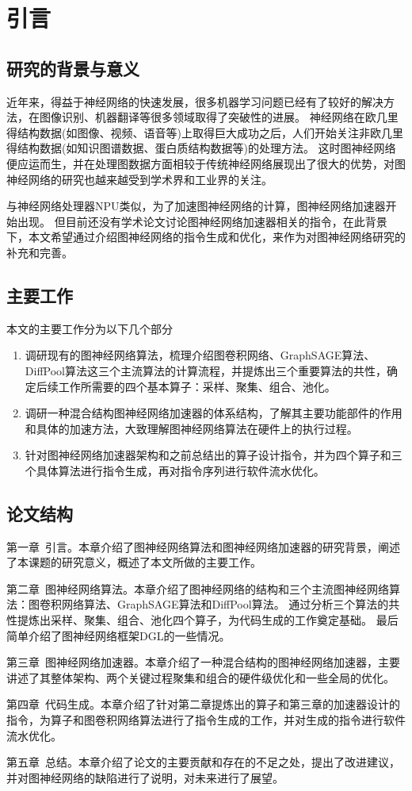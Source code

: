 
\chapter{引言}

\section{研究的背景与意义}

近年来，得益于神经网络的快速发展，很多机器学习问题已经有了较好的解决方法，在图像识别、机器翻译等很多领域取得了突破性的进展。
神经网络在欧几里得结构数据(如图像、视频、语音等)上取得巨大成功之后，人们开始关注非欧几里得结构数据(如知识图谱数据、蛋白质结构数据等)的处理方法。
这时图神经网络便应运而生，并在处理图数据方面相较于传统神经网络展现出了很大的优势，对图神经网络的研究也越来越受到学术界和工业界的关注。

与神经网络处理器NPU类似，为了加速图神经网络的计算，图神经网络加速器开始出现。
但目前还没有学术论文讨论图神经网络加速器相关的指令，在此背景下，本文希望通过介绍图神经网络的指令生成和优化，来作为对图神经网络研究的补充和完善。

\section{主要工作}

本文的主要工作分为以下几个部分
\begin{enumerate}
    \item 调研现有的图神经网络算法，梳理介绍图卷积网络、GraphSAGE算法、DiffPool算法这三个主流算法的计算流程，并提炼出三个重要算法的共性，确定后续工作所需要的四个基本算子：采样、聚集、组合、池化。
    \item 调研一种混合结构图神经网络加速器的体系结构，了解其主要功能部件的作用和具体的加速方法，大致理解图神经网络算法在硬件上的执行过程。
    \item 针对图神经网络加速器架构和之前总结出的算子设计指令，并为四个算子和三个具体算法进行指令生成，再对指令序列进行软件流水优化。
\end{enumerate}

\section{论文结构}

第一章\ 引言。本章介绍了图神经网络算法和图神经网络加速器的研究背景，阐述了本课题的研究意义，概述了本文所做的主要工作。

第二章\ 图神经网络算法。本章介绍了图神经网络的结构和三个主流图神经网络算法：图卷积网络算法、GraphSAGE算法和DiffPool算法。
通过分析三个算法的共性提炼出采样、聚集、组合、池化四个算子，为代码生成的工作奠定基础。
最后简单介绍了图神经网络框架DGL的一些情况。

第三章\ 图神经网络加速器。本章介绍了一种混合结构的图神经网络加速器，主要讲述了其整体架构、两个关键过程聚集和组合的硬件级优化和一些全局的优化。

第四章\ 代码生成。本章介绍了针对第二章提炼出的算子和第三章的加速器设计的指令，为算子和图卷积网络算法进行了指令生成的工作，并对生成的指令进行软件流水优化。

第五章\ 总结。本章介绍了论文的主要贡献和存在的不足之处，提出了改进建议，并对图神经网络的缺陷进行了说明，对未来进行了展望。
